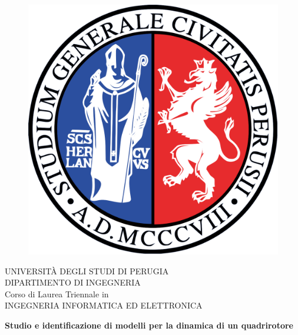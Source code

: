 
\begin{titlepage}
   
\begin{spacing}{1}
	\begin{figure}[!htb]
    	\centering
    	\includegraphics[keepaspectratio=true,scale=0.13]{gfx/logo_unipg}
	\end{figure}

	\begin{center}
    	\normalsize{UNIVERSITÀ DEGLI STUDI DI PERUGIA}
    	\vspace{5mm}
    	\\ \normalsize{DIPARTIMENTO DI INGEGNERIA}
    	\vspace{5mm}
    	\\ \small{Corso di Laurea Triennale in}
    	\vspace{5mm}
    	\\ \normalsize{INGEGNERIA INFORMATICA ED ELETTRONICA}
	\end{center}

	\vspace{15mm}
	
	\begin{center}
    	{\Large{\bf Studio e identificazione di modelli per la dinamica di un quadrirotore}}
	\end{center}
	

\end{spacing}
\end{titlepage}
